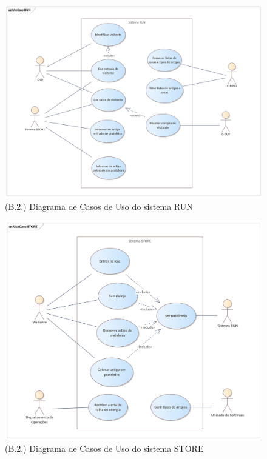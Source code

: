 \documentclass[12pt,a4paper]{article}
\begin{document}
\begin{landscape}
  \begin{figure}
    \centering
    \includegraphics[width=1.3\textwidth]{assets/ea-usecase-run.png}
    \caption{(B.2.) Diagrama de Casos de Uso do sistema RUN}
    \label{fig:uc-run}
  \end{figure}
\end{landscape}

\begin{landscape}
  \begin{figure}
    \centering
    \includegraphics[width=1.15\textwidth]{assets/ea-usecase-store.png}
    \caption{(B.2.) Diagrama de Casos de Uso do sistema STORE}
    \label{fig:uc-store}
  \end{figure}
\end{landscape}
\end{document}

